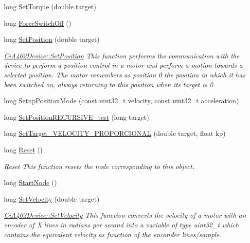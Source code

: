 \begin{DoxyCompactItemize}
long \hyperlink{classCiA402Device_a556c03984774974dd3a1231793916d9b}{Set\+Torque} (double target)
\item 
long \hyperlink{classCiA402Device_aff0503b4caa6d2a8e2e66df6b9e0f4e4}{Force\+Switch\+Off} ()
\item 
long \hyperlink{classCiA402Device_ac13cd5d90f8d39e1ef9734d035e67acb}{Set\+Position} (double target)
\begin{DoxyCompactList}\small\item\em \hyperlink{classCiA402Device_ac13cd5d90f8d39e1ef9734d035e67acb}{Ci\+A402\+Device\+::\+Set\+Position} This function performs the communication with the device to perform a position control in a motor and perform a motion towards a selected position. The motor remembers as position 0 the position in which it has been switched on, always returning to this position when its target is 0. \end{DoxyCompactList}\item 
long \hyperlink{classCiA402Device_a221dbc5461823097981727a3baff5d0c}{Setup\+Position\+Mode} (const uint32\+\_\+t velocity, const uint32\+\_\+t acceleration)
\item 
long \hyperlink{classCiA402Device_ac1c55984abb91928d52b0a49651cc18e}{Set\+Position\+R\+E\+C\+U\+R\+S\+I\+V\+E\+\_\+test} (long target)
\item 
long \hyperlink{classCiA402Device_a1b88a18321d6dbee11258b48d49706ba}{Set\+Target\+\_\+\+V\+E\+L\+O\+C\+I\+T\+Y\+\_\+\+P\+R\+O\+P\+O\+R\+C\+I\+O\+N\+AL} (double target, float kp)
\item 
long \hyperlink{classCiA402Device_ac4a6e4987ebe075d0ac07ee5fd4d410c}{Reset} ()
\begin{DoxyCompactList}\small\item\em Reset This function resets the node corresponding to this object. \end{DoxyCompactList}\item 
long \hyperlink{classCiA402Device_a32b4628098364846fe291312025f6fda}{Start\+Node} ()
\item 
long \hyperlink{classCiA402Device_a498224b82a857197eb2d28beddc74729}{Set\+Velocity} (double target)
\begin{DoxyCompactList}\small\item\em \hyperlink{classCiA402Device_a498224b82a857197eb2d28beddc74729}{Ci\+A402\+Device\+::\+Set\+Velocity} This function converts the velocity of a motor with an encoder of X lines in radians per second into a variable of type uint32\+\_\+t which contains the equivalent velocity as function of the enconder lines/sample. \end{DoxyCompactList}\item 

\end{DoxyCompactItemize}
